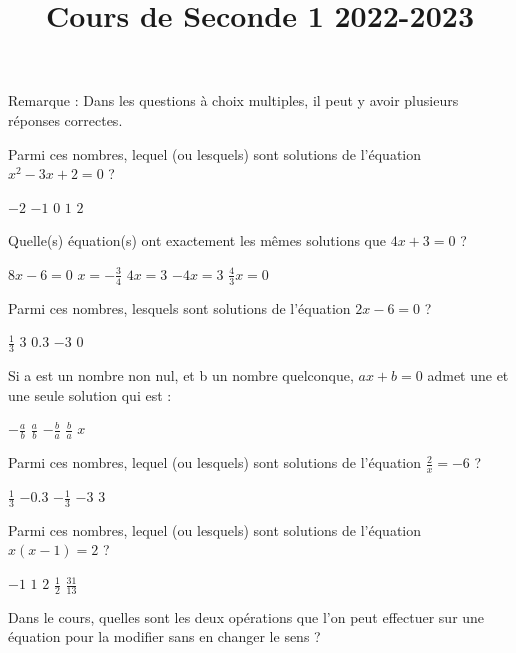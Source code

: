 \documentclass[10pt,a4paper]{exam}
\title{Cours de Seconde 1 2022-2023}
\date{}
\begin{document}
Remarque : Dans les questions à choix multiples, il peut y avoir plusieurs réponses correctes.

Parmi ces nombres, lequel (ou lesquels) sont solutions de l'équation   $x^2 - 3x + 2 = 0$ ?\newline
\begin{oneparcheckboxes}
   \choice $-2$
   \choice $-1$
   \choice $0$
   \choice $1$
   \choice $2$
\end{oneparcheckboxes}

 
Quelle(s) équation(s) ont exactement les mêmes solutions que $4x+3=0$ ?\newline
\begin{oneparcheckboxes}
   \choice $8x-6=0$
   \choice $x= -\frac{3}{4}$
   \choice $4x = 3$
   \choice $-4x = 3$
   \choice $\frac{4}{3}x= 0$
\end{oneparcheckboxes}
 

Parmi ces nombres, lesquels sont solutions de l'équation   $2x-6=0$ ?\newline
\begin{oneparcheckboxes}
   \choice $\frac{1}{3}$
   \choice $3$
   \choice $0.3$
   \choice $-3$
   \choice $0$
\end{oneparcheckboxes}
 

Si a est un nombre non nul, et b un nombre quelconque, $ax+b=0$  admet une et une seule solution qui est :\newline
\begin{oneparcheckboxes}
   \choice $-\frac{a}{b}$
   \choice $\frac{a}{b}$
   \choice $-\frac{b}{a}$
   \choice $\frac{b}{a}$
   \choice $x$
\end{oneparcheckboxes}
 
Parmi ces nombres, lequel (ou lesquels) sont solutions de l'équation   $\frac{2}{x}=-6$ ?\newline
\begin{oneparcheckboxes}
   \choice $\frac{1}{3}$
   \choice $-0.3$
   \choice $-\frac{1}{3}$
   \choice $-3$
   \choice $3$
\end{oneparcheckboxes}
 
Parmi ces nombres, lequel (ou lesquels) sont solutions de l'équation   $x(x-1) = 2$ ?\newline
\begin{oneparcheckboxes}
   \choice $-1$
   \choice $1$
   \choice $2$
   \choice $\frac{1}{2}$
   \choice $\frac{31}{13}$
\end{oneparcheckboxes}
 
Dans le cours, quelles sont les deux opérations que l'on peut effectuer sur une équation pour la modifier sans en changer le sens ?
\end{document}
